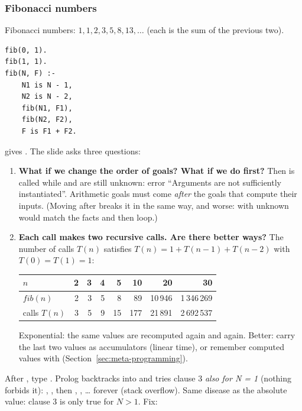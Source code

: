 \subsubsection{Fibonacci numbers}

Fibonacci numbers: $1, 1, 2, 3, 5, 8, 13, \ldots$ (each is the sum of the previous two).
\begin{verbatim}
fib(0, 1).
fib(1, 1).
fib(N, F) :-
    N1 is N - 1,
    N2 is N - 2,
    fib(N1, F1),
    fib(N2, F2),
    F is F1 + F2.
\end{verbatim}
 gives . The slide asks three questions:

\begin{enumerate}
  \item \textbf{What if we change the order of goals? What if we do 
        first?} Then  is called while  and  are still unknown:
        error ``Arguments are not sufficiently instantiated''. Arithmetic goals must come
        \emph{after} the goals that compute their inputs. (Moving  after
         breaks it in the same way, and worse:  with
        unknown  would match the facts and then loop.)
  \item \textbf{Each call makes two recursive calls. Are there better ways?} The number of
        calls $T(n)$ satisfies $T(n) = 1 + T(n-1) + T(n-2)$ with $T(0) = T(1) = 1$:
        \begin{center}
        \small
        \begin{tabular}{@{}l*{7}{r}@{}}
        \toprule
        $n$ & 2 & 3 & 4 & 5 & 10 & 20 & 30 \\
        \midrule
        $\mathit{fib}(n)$ & 2 & 3 & 5 & 8 & 89 & 10\,946 & 1\,346\,269 \\
        calls $T(n)$ & 3 & 5 & 9 & 15 & 177 & 21\,891 & 2\,692\,537 \\
        \bottomrule
        \end{tabular}
        \end{center}
        Exponential: the same values are recomputed again and again. Better: carry the last
        two values as accumulators (linear time), or remember computed values with
         (Section~\ref{sec:meta-programming}).
\end{enumerate}

\begin{nbwarning}
\notinslides
After , type \code{;}. Prolog backtracks into  and tries clause 3
\emph{also for N = 1} (nothing forbids it): , , then
, , \ldots{} forever (stack overflow). Same disease as the
absolute value: clause 3 is only true for $N > 1$. Fix: 
\end{nbwarning}

